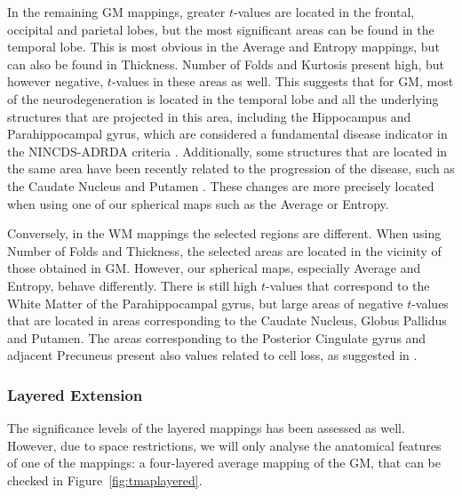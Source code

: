 In the remaining \ac{GM} mappings, greater $t$-values are located in the frontal, occipital and parietal lobes, but the most significant areas can be found in the temporal lobe. This is most obvious in the Average and Entropy mappings, but can also be found in Thickness. Number of Folds and Kurtosis present high, but however negative, $t$-values in these areas as well. This suggests that for \ac{GM}, most of the neurodegeneration is located in the temporal lobe and all the underlying structures that are projected in this area, including the Hippocampus and Parahippocampal gyrus, which are considered a fundamental disease indicator in the NINCDS-ADRDA criteria \cite{Dubois2007}. Additionally, some structures that are located in the same area have been recently related to the progression of the disease, such as the Caudate Nucleus and Putamen \cite{Pievani2013}. These changes are more precisely located when using one of our spherical maps such as the Average or Entropy.

Conversely, in the \ac{WM} mappings the selected regions are different. When using Number of Folds and Thickness, the selected areas are located in the vicinity of those obtained in \ac{GM}. However, our spherical maps, especially Average and Entropy, behave differently. There is still high $t$-values that correspond to the White Matter of the Parahippocampal gyrus, but large areas of negative $t$-values that are located in areas corresponding to the Caudate Nucleus, Globus Pallidus and Putamen. The areas corresponding to the Posterior Cingulate gyrus and adjacent Precuneus present also values related to cell loss, as suggested in \cite{Baron2001}.

\subsubsection{Layered Extension}\label{sec:layeredttest}
The significance levels of the layered mappings has been assessed as well. However, due to space restrictions, we will only analyse the anatomical features of one of the mappings: a four-layered average mapping of the \ac{GM}, that can be checked in Figure~\ref{fig:tmaplayered}.

